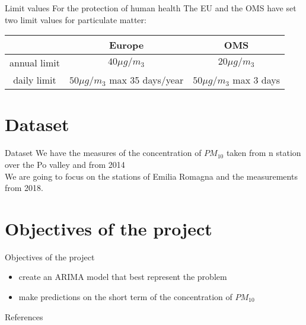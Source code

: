 \documentclass{beamer}
\begin{document}
\begin{frame}{Limit values}
For the protection of human health The EU and the OMS have set two limit values for particulate matter:
\begin{tabular}{|c|c|c|}
\hline 
 & Europe & OMS \\ 
\hline 
annual limit & $40 \mu g / m_3$ & $20 \mu g / m_3$ \\ 
\hline 
daily limit & $50 \mu g / m_3$   max 35 days/year & $50 \mu g / m_3$ max 3 days \\
\hline 
\end{tabular} 

\end{frame}

\section{Dataset}
\begin{frame}{Dataset}
    We have the measures of the concentration of $PM_{10}$ taken from n station over the Po valley and from 2014\\
    
    We are going to focus on the stations of Emilia Romagna and the measurements from 2018.
\end{frame}

\section{Objectives of the project}
\begin{frame}{Objectives of the project}

\begin{itemize}
    \item create an ARIMA model that best represent the problem
    \item make predictions on the short term of the concentration of $PM_{10}$
   
\end{itemize}
    

\end{frame}

%
%



\begin{frame}[allowframebreaks]{References}


\end{frame}

\end{document}
